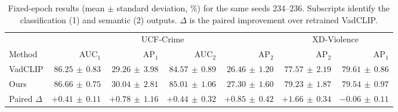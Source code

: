 \begin{table}[t]
\centering
\caption{Fixed-epoch results (mean $\pm$ standard deviation, \%) for the same seeds 234--236. Subscripts identify the classification (1) and semantic (2) outputs. $\Delta$ is the paired improvement over retrained VadCLIP.}
\label{tab:controlled}
\small\setlength{\tabcolsep}{4.0pt}
\begin{tabular}{lrrrrrr}\toprule
& \multicolumn{4}{c}{UCF-Crime} & \multicolumn{2}{c}{XD-Violence}\\
\cmidrule(lr){2-5}\cmidrule(lr){6-7}
Method & AUC$_1$ & AP$_1$ & AUC$_2$ & AP$_2$ & AP$_2$ & AP$_1$\\\midrule
VadCLIP & $86.25\,\pm\,0.83$ & $29.26\,\pm\,3.98$ & $84.57\,\pm\,0.89$ & $26.46\,\pm\,1.20$ & $77.57\,\pm\,2.19$ & $79.61\,\pm\,0.86$ \\
Ours & $\mathbf{86.66\,\pm\,0.75}$ & $\mathbf{30.04\,\pm\,2.81}$ & $\mathbf{85.01\,\pm\,1.06}$ & $\mathbf{27.30\,\pm\,1.60}$ & $\mathbf{79.23\,\pm\,1.87}$ & $79.54\,\pm\,0.97$ \\
Paired $\Delta$ & $+0.41\,\pm\,0.11$ & $+0.78\,\pm\,1.16$ & $+0.44\,\pm\,0.32$ & $+0.85\,\pm\,0.42$ & $+1.66\,\pm\,0.34$ & $-0.06\,\pm\,0.11$ \\
\bottomrule\end{tabular}\end{table}
